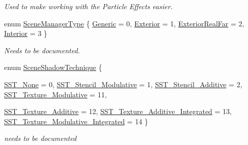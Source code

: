 \begin{DoxyCompactItemize}
\begin{DoxyCompactList}\small\item\em Used to make working with the Particle Effects easier. \item\end{DoxyCompactList}\item 
enum \hyperlink{classMezzanine_1_1SceneManager_ad6e20c08b97a230314abda3e5826f274}{SceneManagerType} \{ \hyperlink{classMezzanine_1_1SceneManager_ad6e20c08b97a230314abda3e5826f274a6cd584c01715ad16c076728aea716607}{Generic} =  0, 
\hyperlink{classMezzanine_1_1SceneManager_ad6e20c08b97a230314abda3e5826f274a3cc51919e031a43bf4588dac5b693d0e}{Exterior} =  1, 
\hyperlink{classMezzanine_1_1SceneManager_ad6e20c08b97a230314abda3e5826f274a22b864e95238f8719579e4112b99e349}{ExteriorRealFar} =  2, 
\hyperlink{classMezzanine_1_1SceneManager_ad6e20c08b97a230314abda3e5826f274a1cd5d84d522f7a4692d8c524ace547fe}{Interior} =  3
 \}
\begin{DoxyCompactList}\small\item\em Needs to be documented. \item\end{DoxyCompactList}\item 
enum \hyperlink{classMezzanine_1_1SceneManager_a8149cd1ec188e0d57935d71c6a7134c6}{SceneShadowTechnique} \{ \par
\hyperlink{classMezzanine_1_1SceneManager_a8149cd1ec188e0d57935d71c6a7134c6aeedc28307131c43b9ae0bff12c8b1cda}{SST\_\-None} =  0, 
\hyperlink{classMezzanine_1_1SceneManager_a8149cd1ec188e0d57935d71c6a7134c6a616375ae458dbd612ff9745895d7e1f1}{SST\_\-Stencil\_\-Modulative} =  1, 
\hyperlink{classMezzanine_1_1SceneManager_a8149cd1ec188e0d57935d71c6a7134c6a216c1b4f5e8b891ae9e74abf48790ec8}{SST\_\-Stencil\_\-Additive} =  2, 
\hyperlink{classMezzanine_1_1SceneManager_a8149cd1ec188e0d57935d71c6a7134c6acfa2f5f4596184169e9a6495273fe6c7}{SST\_\-Texture\_\-Modulative} =  11, 
\par
\hyperlink{classMezzanine_1_1SceneManager_a8149cd1ec188e0d57935d71c6a7134c6a966cfba4dd29dd9248c6283ec37e3d8f}{SST\_\-Texture\_\-Additive} =  12, 
\hyperlink{classMezzanine_1_1SceneManager_a8149cd1ec188e0d57935d71c6a7134c6ae673066d535f340debfa4a6210d6b0ce}{SST\_\-Texture\_\-Additive\_\-Integrated} =  13, 
\hyperlink{classMezzanine_1_1SceneManager_a8149cd1ec188e0d57935d71c6a7134c6ab4ff7a97c53ca46f7628541c9e39309c}{SST\_\-Texture\_\-Modulative\_\-Integrated} =  14
 \}
\begin{DoxyCompactList}\small\item\em needs to be documented \item\end{DoxyCompactList}\item 

\end{DoxyCompactItemize}
